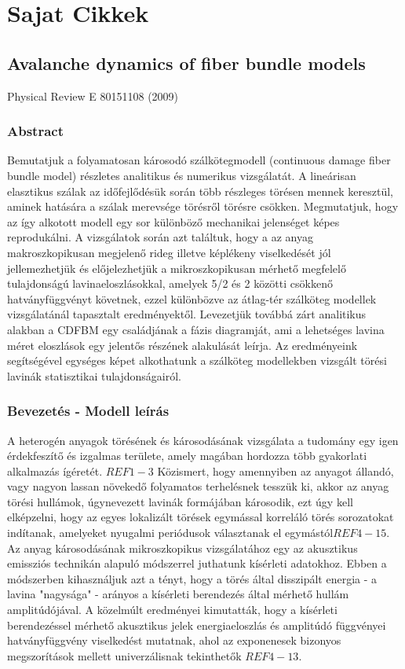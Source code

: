 \chapter{Sajat Cikkek}
\section{Avalanche dynamics of fiber bundle models}
Physical Review E 80151108 (2009)
\subsection{Abstract}
Bemutatjuk a folyamatosan károsodó szálkötegmodell (continuous damage fiber bundle model) részletes analitikus és numerikus vizsgálatát. A lineárisan elasztikus szálak az időfejlődésük során több részleges törésen mennek keresztül, aminek hatására a szálak merevsége törésről törésre csökken. Megmutatjuk, hogy az így alkotott modell egy sor különböző mechanikai jelenséget képes reprodukálni. A vizsgálatok során azt találtuk, hogy a az anyag makroszkopikusan megjelenő rideg illetve képlékeny viselkedését jól jellemezhetjük és előjelezhetjük a mikroszkopikusan mérhető megfelelő tulajdonságú lavinaeloszlásokkal, amelyek 5/2 és 2 közötti csökkenő hatványfüggvényt követnek, ezzel különbözve az átlag-tér szálköteg modellek vizsgálatánál tapasztalt eredményektől. Levezetjük továbbá zárt analitikus alakban a CDFBM egy családjának a fázis diagramját, ami a lehetséges lavina méret eloszlások egy jelentős részének alakulását leírja. Az eredményeink segítségével egységes képet alkothatunk a szálköteg modellekben vizsgált törési lavinák statisztikai tulajdonságairól.
\subsection{Bevezetés - Modell leírás}
A heterogén anyagok törésének és károsodásának vizsgálata a tudomány egy igen érdekfeszítő és izgalmas területe, amely magában hordozza több gyakorlati alkalmazás ígéretét. $REF1-3$ 
Közismert, hogy amennyiben az anyagot állandó, vagy nagyon lassan növekedő folyamatos terhelésnek tesszük ki, akkor az anyag törési hullámok, úgynevezett lavinák formájában károsodik, ezt úgy kell elképzelni, hogy az egyes lokalizált törések egymással korreláló törés sorozatokat indítanak, amelyeket nyugalmi periódusok választanak el egymástól$REF4-15$. 
Az anyag károsodásának mikroszkopikus vizsgálatához egy az akusztikus emissziós technikán alapuló módszerrel juthatunk kísérleti adatokhoz. Ebben a módszerben kihasználjuk azt a tényt, hogy a törés által disszipált energia - a lavina "nagysága" - arányos a kísérleti berendezés által mérhető hullám amplitúdójával. A közelmúlt eredményei kimutatták, hogy a kísérleti berendezéssel mérhető akusztikus jelek energiaeloszlás és amplitúdó függvényei hatványfüggvény viselkedést mutatnak, ahol az exponenesek bizonyos megszorítások mellett univerzálisnak tekinthetők $REF4-13$.

